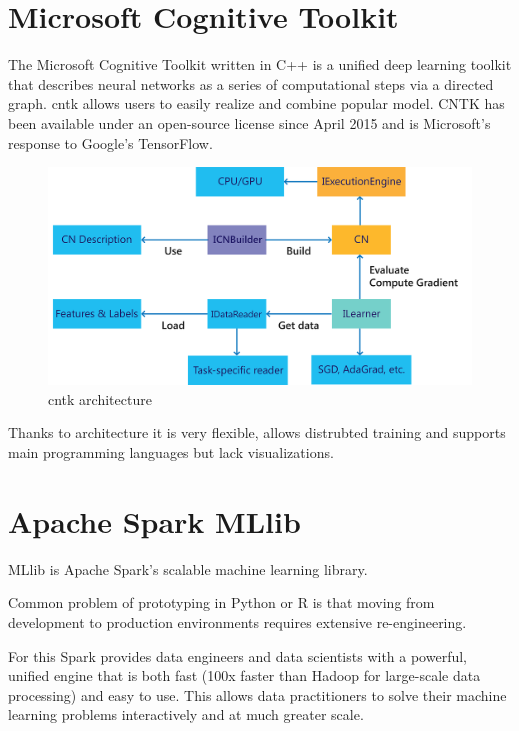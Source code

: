\documentclass[thesis=M,english]{FITthesis}[2012/06/26]
\begin{document}
\section{Microsoft Cognitive Toolkit}

The Microsoft Cognitive Toolkit\cite{ml_cntk} written in C++ is a unified deep learning toolkit that describes neural networks as a series of computational steps via a directed graph. \acrshort{cntk} allows users to easily realize and combine popular model. CNTK has been available under an open-source license since April 2015 and is Microsoft's response to Google's TensorFlow.


\begin{figure}[h!]\centering
	\includegraphics[width=1\textwidth]{pictures/ml_cntk_architecture}
	\caption{\acrshort{cntk} architecture \cite{ml_cntk}}\label{fig:ml_cntk_architecture}
\end{figure}

Thanks to architecture it is very flexible, allows distrubted training and supports main programming languages but lack visualizations.

\section{Apache Spark MLlib}

MLlib\cite{ml_spark} is Apache Spark's scalable machine learning library.

Common\cite{ml_spark_advantages]} problem of prototyping in Python or R is that moving from development to production environments requires extensive re-engineering. 

For this Spark provides data engineers and data scientists with a powerful, unified engine that is both fast (100x faster than Hadoop for large-scale data processing) and easy to use. This allows data practitioners to solve their machine learning problems interactively and at much greater scale.\\
\end{document}
